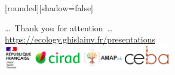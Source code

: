 \documentclass[10pt,table,dvipsnames,compress]{beamer}
\begin{document}

{
  [rounded][shadow=false]
  \begin{frame}[plain]
    \begin{block}{}
      \begin{center}
        \ldots~Thank you for attention~\ldots \\
        \url{https://ecology.ghislainv.fr/presentations} \\
        \includegraphics[width=0.55\textwidth]{figs/partners_logos}
      \end{center}
    \end{block}
  \end{frame}
}
\end{document}
